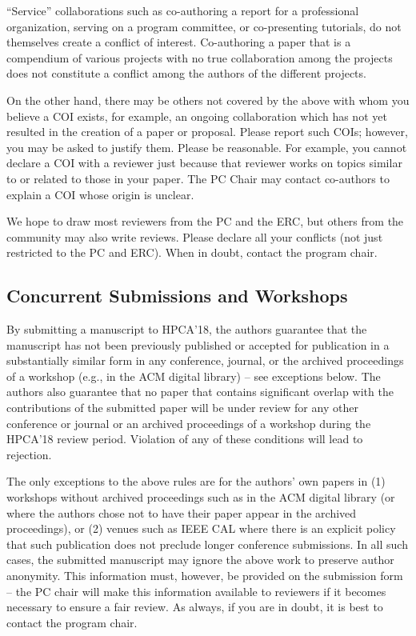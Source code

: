 \documentclass{sig-alternate}
\begin{document}
``Service'' collaborations such as co-authoring a report for a professional
organization, serving on a program committee, or co-presenting
tutorials, do not themselves create a conflict of interest.
Co-authoring a paper that is a compendium of various projects with
no true collaboration among the projects does not constitute a
conflict among the authors of the different projects.

On the other hand, there may be others not covered by the above with
whom you believe a COI exists, for example, an ongoing collaboration
which has not yet resulted in the creation of a paper or proposal.
Please report such COIs; however, you may be asked to justify them.
Please be reasonable. For example, you cannot declare a COI with a
reviewer just because that reviewer works on topics similar to or
related to those in your paper.  The PC Chair may contact co-authors
to explain a COI whose origin is unclear.

We hope to draw most reviewers from the PC and the ERC, but others from the
community may also write reviews.  Please declare all your conflicts (not
just restricted to the PC and ERC).  When in doubt, contact the program
chair.

\subsection{Concurrent Submissions and Workshops}

By submitting a manuscript to HPCA'18, the authors guarantee that the
manuscript has not been previously published or accepted for publication in
a substantially similar form in any conference, journal, or the archived
proceedings of a workshop (e.g., in the ACM digital library) -- see
exceptions below. The authors also guarantee that no paper that contains
significant overlap with the contributions of the submitted paper will be
under review for any other conference or journal or an archived proceedings
of a workshop during the HPCA'18 review period. Violation of any of these
conditions will lead to rejection.

The only exceptions to the above rules are for the authors' own papers
in (1) workshops without archived proceedings such as in the ACM
digital library (or where the authors chose not to have their paper
appear in the archived proceedings), or (2) venues such as IEEE CAL
where there is an explicit policy that such publication does not
preclude longer conference submissions.  In all such cases, the
submitted manuscript may ignore the above work to preserve author
anonymity. This information must, however, be provided on the
submission form -- the PC chair will make this information available
to reviewers if it becomes necessary to ensure a fair review.  As
always, if you are in doubt, it is best to contact the program chair.
\end{document}
